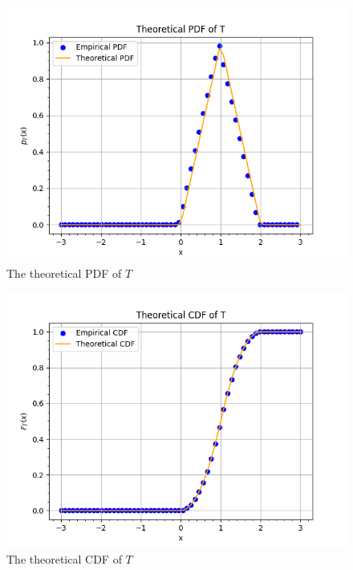 \documentclass[journal,12pt,twocolumn]{IEEEtran}
\renewcommand\thesection{\arabic{section}}
\begin{document}
\begin{enumerate}[label=\thesection.\arabic*
,ref=\thesection.\theenumi]
\begin{figure}[ht!]
    \includegraphics[width=\columnwidth]{./figs/fig4.5.png}
    \caption{The theoretical PDF of $T$}
    \label{fig:theory_tri_pdf}
\end{figure}
\begin{figure}[ht!]
    \centering
    \includegraphics[width=\columnwidth]{./figs/fig4.5b.png}
    \caption{The theoretical CDF of $T$}
    \label{fig:theory_tri_cdf}
\end{figure}
\end{enumerate}
%
\end{document}
